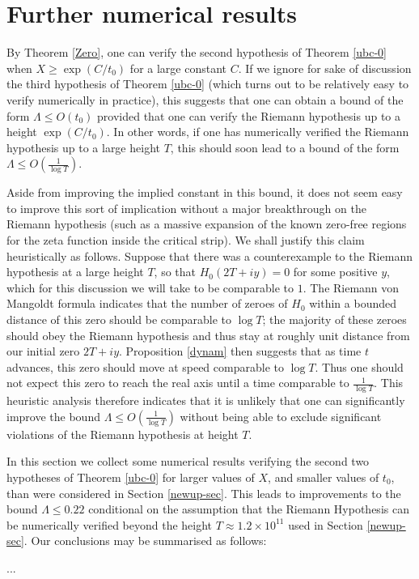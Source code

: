 \section{Further numerical results}

By Theorem \ref{Zero}, one can verify the second hypothesis of Theorem \ref{ubc-0} when $X \geq \exp(C/t_0)$ for a large constant $C$.  If we ignore for sake of discussion the third hypothesis of Theorem \ref{ubc-0} (which turns out to be relatively easy to verify numerically in practice), this suggests that one can obtain a bound of the form $\Lambda \leq O(t_0)$ provided that one can verify the Riemann hypothesis up to a height $\exp(C/t_0)$.  In other words, if one has numerically verified the Riemann hypothesis up to a large height $T$, this should soon lead to a bound of the form $\Lambda \leq O \left( \frac{1}{\log T} \right )$.

Aside from improving the implied constant in this bound, it does not seem easy to improve this sort of implication without a major breakthrough on the Riemann hypothesis (such as a massive expansion of the known zero-free regions for the zeta function inside the critical strip).  We shall justify this claim heuristically as follows. Suppose that there was a counterexample to the Riemann hypothesis at a large height $T$, so that $H_0(2T + iy) = 0$ for some positive $y$, which for this discussion we will take to be comparable to $1$.  The Riemann von Mangoldt formula indicates that the number of zeroes of $H_0$ within a bounded distance of this zero should be comparable to $\log T$; the majority of these zeroes should obey the Riemann hypothesis and thus stay at roughly unit distance from our initial zero $2T+iy$.  Proposition \ref{dynam} then suggests that as time $t$ advances, this zero should move at speed comparable to $\log T$.  Thus one should not expect this zero to reach the real axis until a time comparable to $\frac{1}{\log T}$.  This heuristic analysis therefore indicates that it is unlikely that one can significantly improve the bound $\Lambda \leq O \left( \frac{1}{\log T} \right )$ without being able to exclude significant violations of the Riemann hypothesis at height $T$.

In this section we collect some numerical results verifying the second two hypotheses of Theorem \ref{ubc-0} for larger values of $X$, and smaller values of $t_0$, than were considered in Section \ref{newup-sec}.  This leads to improvements to the bound $\Lambda \leq 0.22$ conditional on the assumption that the Riemann Hypothesis can be numerically verified beyond the height $T \approx 1.2 \times 10^{11}$ used in Section \ref{newup-sec}.  Our conclusions may be summarised as follows:

...
